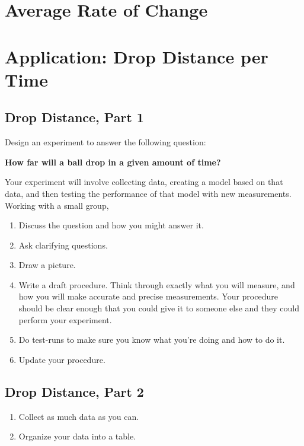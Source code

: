 \section{Average Rate of Change}


\newpage 
\section{Application: Drop Distance per Time}

\vspace{15mm}
    \subsection*{Drop Distance, Part 1}
Design an experiment to answer the following question:
\begin{center}
	\textbf{How far will a ball drop in a given amount of time?}
\end{center}
Your experiment will involve collecting data, creating a model based on that data, and then testing the performance of that model with new measurements.  
Working with a small group, 
\begin{enumerate}
	\item Discuss the question and how you might answer it.
	\item Ask clarifying questions. 
	\item Draw a picture.
	\item Write a draft procedure. 
		Think through exactly what you will measure, and how you will make accurate and precise measurements.  
		Your procedure should be clear enough that you could give it to someone else and they could perform your experiment. 
	\item Do test-runs to make sure you know what you're doing and how to do it.
	\item Update your procedure. 
\end{enumerate}



\vspace{15mm}
    \subsection*{Drop Distance, Part 2}
\begin{enumerate}
	\item Collect as much data as you can.
	\item Organize your data into a table. 
\end{enumerate}
    
